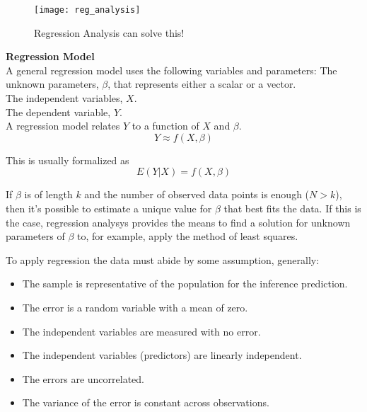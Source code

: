 \begin{figure}[H]
	\centering
	\texttt{[image: reg\_analysis]}
	\caption{Regression Analysis can solve this! \cite{reg_analisys}}
	\label{fig:reg_analysis}
\end{figure}

\textbf{Regression Model} \\
A general regression model uses the following variables and parameters:
The unknown parameters, $\beta$, that represents either a scalar or a vector.\\
The independent variables, $X$. \\
The dependent variable, $Y$.\\

A regression model relates $Y$ to a function of $X$ and $\beta$.
\begin{equation}
	Y \approx f(X,\beta)
\end{equation}

This is usually formalized as
\begin{equation}
	E(Y|X) = f(X,\beta)
\end{equation}

If $\beta$ is of length $k$ and the number of observed data points is enough ($N > k$), then it's possible to estimate a unique value for $\beta$ that best fits the data. If this is the case, regression analysys provides the means to find a solution for unknown parameters of $\beta$ to, for example, apply the method of least squares.

To apply regression the data must abide by some assumption, generally:
\begin{itemize}[noitemsep, topsep = -5pt]
	\item The sample is representative of the population for the inference prediction.
	\item The error is a random variable with a mean of zero.
	\item The independent variables are measured with no error.
	\item The independent variables (predictors) are linearly independent.
	\item The errors are uncorrelated.
	\item The variance of the error is constant across observations.
\end{itemize}

